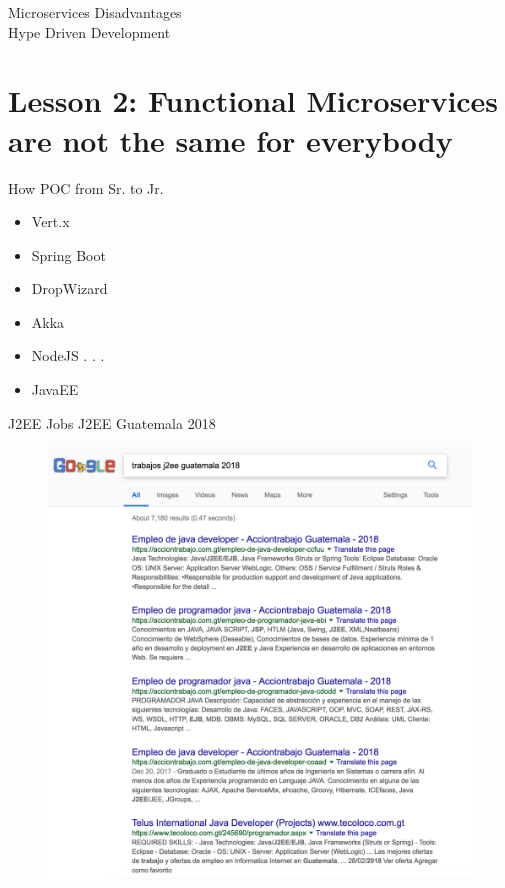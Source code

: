 \documentclass{beamer}
\begin{document}
\begin{frame}{Microservices}
Disadvantages \\

\huge Hype Driven Development
\end{frame}


\section{Lesson 2: Functional Microservices are not the same for everybody}
\begin{frame}{How}
POC from Sr. to Jr.
\begin{itemize}
	\item Vert.x
	\item Spring Boot
	\item DropWizard
	\item Akka
	\item NodeJS
. . .
	\item JavaEE
\end{itemize}
\end{frame}

\begin{frame}{J2EE}
Jobs J2EE Guatemala 2018
\begin{figure}
	\centering
	\includegraphics[width=\linewidth]{Images/javaee}
\end{figure}
\end{frame}
\end{document}
